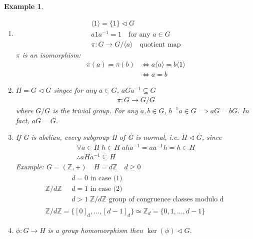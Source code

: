 \documentclass[11pt, oneside]{book}
\theoremstyle{break}
\newtheorem{eg}{Example}[section]
\newcommand{\bb}[1]{\mathbb{#1}}			%
\begin{document}
\begin{eg}
    \begin{enumerate}
            \item
                \begin{gather*}
                    \langle 1 \rangle = \{ 1 \} \triangleleft G \\
                    a1a^{-1} = 1 \quad \text{for any $a \in G$} \\
                    \pi : G \to G/\langle a \rangle \quad \text{quotient map}
                \end{gather*}
                $\pi$ is an isomorphism:
                \begin{align*}
                    \pi(a) = \pi(b) &\iff a \langle a \rangle = b \langle 1 \rangle \\
                        &\iff a = b
                \end{align*}
            \item $H = G \triangleleft G$ singce for any $a \in G$, $aGa^{-1} \subseteq G$
                \begin{gather*}
                    \pi : G \to G/G
                \end{gather*}
                where $G/G$ is the trivial group. For any $a, b \in G$, $b^{-1}a \in G \implies aG = bG$. In fact, $aG = G$.
            \item If G is abelian, every subgroup H of G is normal, i.e. $H \triangleleft G$, since
                \begin{gather*}
                    \forall a \in H \; h \in H \; aha^{-1} = aa^{-1}h = h \in H \\
                    \therefore aHa^{-1} \subseteq H
                \end{gather*}
                Example: $G = (\bb{Z}, +) \quad H = d\bb{Z} \quad d \geq 0$
                \begin{gather*}
                    \bb{Z}/d\bb{Z} \quad \substack{d = 0 \text{ in case (1)} \\ d = 1 \text{ in case (2)} \\ d > 1 \; \bb{Z}/d\bb{Z} \text{ group of congruence classes modulo d}} \\
                    \bb{Z} / d\bb{Z} = \{[0]_d, ..., [d-1]_d \} \simeq \bb{Z}_d = \{0, 1, ..., d - 1 \}
                \end{gather*}

                \item $\phi : G \to H$ is a group homomorphism then $\ker(\phi) \triangleleft G$.


\end{enumerate}
\end{eg}
\end{document}

